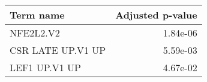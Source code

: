 \begin{tabular}{lr}
\toprule
        Term name &  Adjusted p-value \\
\midrule
        NFE2L2.V2 &          1.84e-06 \\
CSR LATE UP.V1 UP &          5.59e-03 \\
    LEF1 UP.V1 UP &          4.67e-02 \\
\bottomrule
\end{tabular}
